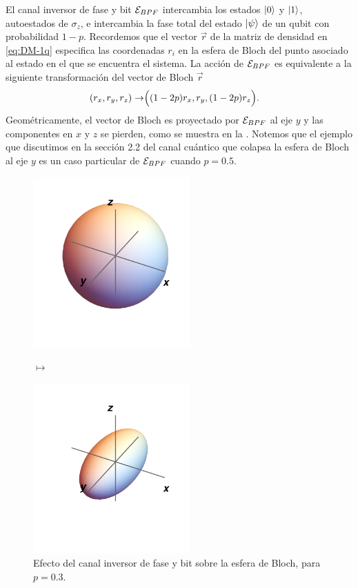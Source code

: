 El canal inversor de fase y bit $\mathcal{E}_{BPF}$ intercambia 
los estados $\ket{0}$ y $\ket{1}$, 
autoestados de $\sigma_z$, e intercambia la fase total
del estado $\ket{\psi}$ de un qubit con probabilidad $1-p$. 
Recordemos que el vector $\vec{r}$ de la matriz de densidad en \eqref{eq:DM-1q} 
especifica las coordenadas $r_i$ en la esfera de Bloch del punto asociado al estado
en el que se encuentra el sistema. La acción de $\mathcal{E}_{BPF}$ es 
equivalente a la siguiente transformación del vector de Bloch $\vec{r}$
\begin{align}
\qty(r_x,r_y,r_z)\rightarrow&\Big(\qty(1-2p)r_x,r_y,\qty(1-2p)r_z\Big).
\label{eq:bit-phase-flip-Bloch-trans}
\end{align}
Geométricamente, el vector de Bloch es proyectado por $\mathcal{E}_{BPF}$ 
al eje $y$ y las componentes en $x$ y $z$ se pierden, como 
se muestra en la .
Notemos que el ejemplo que discutimos en la sección 2.2 del 
canal cuántico que colapsa la esfera de Bloch al eje $y$ es un caso
particular de $\mathcal{E}_{BPF}$ cuando $p=0.5$.
\begin{figure}[H]
\centering
\begin{minipage}{.4\textwidth}
    \centering
    \includegraphics[width=6cm]{images/bloch-ball}
\end{minipage}
$\longmapsto$
\begin{minipage}{0.4\textwidth}
    \centering
    \includegraphics[width=6cm]{images/bit-phase-flip}
\end{minipage}
\caption{Efecto del canal inversor de fase y bit sobre la esfera de Bloch, 
para $p=0.3$.}
\label{fig:bit-phase-flip}
\end{figure}
